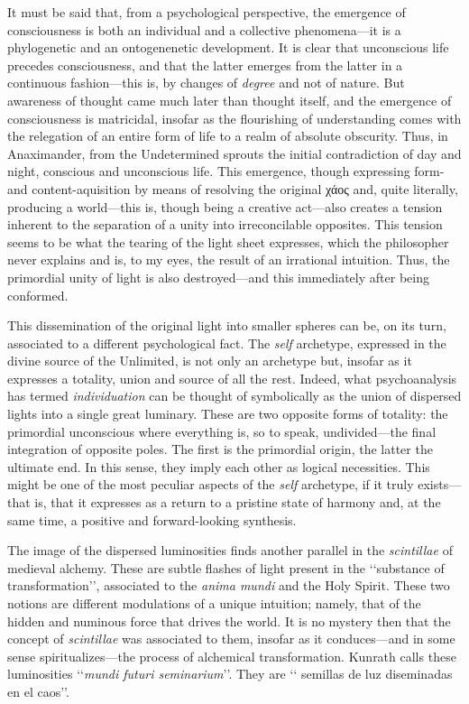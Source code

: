 \documentclass[a4paper]{article}
\begin{document}
It must be said that, from a psychological perspective, the emergence of
consciousness is both an individual and a collective phenomena---it is a 
phylogenetic and an ontogenenetic development. It is clear that unconscious
life precedes consciousness, and that the latter emerges from the latter in a
continuous fashion---this is, by changes of \textit{degree} and not of
nature. But awareness of thought came much later than thought itself, and
the emergence of consciousness is matricidal, insofar as the
flourishing of understanding comes with the relegation of an entire form of life
to a realm of absolute obscurity. Thus, in Anaximander, from the Undetermined
sprouts the initial contradiction of day and night, conscious and unconscious
life. This emergence, though expressing form- and content-aquisition by
means of resolving the original χάος and, quite literally, producing a
world---this is, though being a creative act---also creates a tension inherent to the
separation of a unity into irreconcilable opposites. This tension seems to be
what the tearing of the light sheet expresses, which the philosopher never
explains and is, to my eyes, the result of an irrational intuition. Thus, the
primordial unity of light is also destroyed---and this immediately after being
conformed.

This dissemination of the original light into smaller spheres can be, on its
turn, associated to a different psychological fact. The \textit{self} archetype,
expressed in the divine source of the Unlimited, is not only an archetype but,
insofar as it expresses a totality, union and source of all the rest. Indeed,
what psychoanalysis has termed \textit{individuation} can be thought of
symbolically as the union of dispersed lights into a single great luminary.
These are two opposite forms of totality: the primordial unconscious where
everything is, so to speak, undivided---the final integration of opposite poles.
The first is the primordial origin, the latter the ultimate end. In this sense,
they imply each other as logical necessities. This might be one of the most
peculiar aspects of the \textit{self} archetype, if it truly exists---that is,
that it expresses as a return to a pristine state of harmony and, at the same
time, a positive and forward-looking synthesis.

The image of the dispersed luminosities finds another parallel in the
\textit{scintillae} of medieval alchemy. These are subtle flashes of light
present in the \lq\lq substance of transformation\rq\rq{}, associated to the
\textit{anima mundi} and the Holy Spirit. These two notions are different
modulations of a unique intuition; namely, that of the hidden and numinous force
that drives the world. It is no mystery then that the concept of
\textit{scintillae} was associated to them, insofar as it conduces---and in some
sense spiritualizes---the process of alchemical transformation. Kunrath calls
these luminosities \lq\lq \textit{mundi futuri seminarium}\rq\rq{}. They are \lq\lq
semillas de luz diseminadas en el caos\rq\rq{}.
\end{document}

